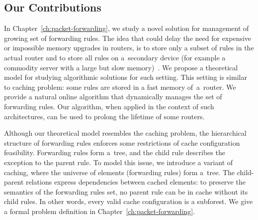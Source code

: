 \subsection{Our Contributions}

In Chapter~\ref{ch:packet-forwarding}, we study a novel solution for management of growing set of forwarding rules.
The idea that could delay the need for expensive or impossible memory upgrades in routers, is to store
only a subset of rules in the actual router and to store all rules on a~secondary
device (for example a commodity server with a large but slow
memory)~\cite{cacheflow,route-caching-flat,prefix-caching,fib-caching-non-overlapping,fibium-zipf}.
We propose a theoretical model for studying algorithmic solutions for such setting.
This setting is similar to caching problem: some rules are stored in a fast memory of~a~router.
We provide a natural online algorithm that dynamically manages the set of forwarding rules.
Our 
algorithm, when applied in the context of such architectures, can 
be used to prolong the lifetime of some routers.


Although our theoretical model resembles the caching problem, the hierarchical structure of forwarding rules enforces some restrictions of cache configuration feasibility.
Forwarding rules form a~tree, and the child rule describes the exception to the parent rule.
To model this issue, we introduce a variant of caching, where the universe of elements (forwarding rules) form a~tree.
The child-parent relations express dependencies between cached elements: to preserve the semantics of the forwarding rules set, no parent rule can be in cache without its child rules.
In other words, every valid cache configuration is a subforest.
We give a formal problem definition in Chapter~\ref{ch:packet-forwarding}.


